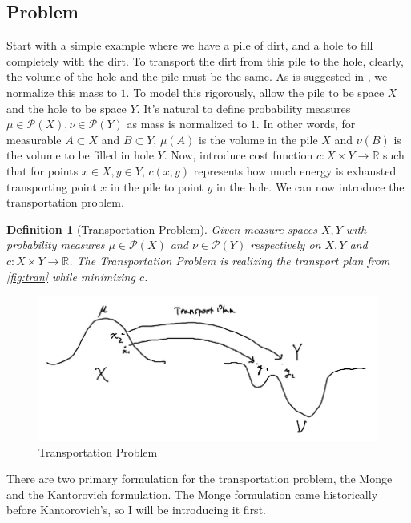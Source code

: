 \documentclass[12pt]{article}
\newcommand{\comp}[2]{
\vspace{0.2in}\begin{mdframed}[
  backgroundcolor=problem,
  userdefinedwidth=10cm,
  align=center,
  skipabove=\topsep,
  skipbelow=\topsep
  ]
  \emph{{#1}:\newline} {#2}
\end{mdframed}}
\theoremstyle{plain}
\newtheorem{defn}{Definition}[section]
\numberwithin{equation}{section}
\begin{document}
\subsection{Problem}
Start with a simple example where we have a pile of dirt, and a hole to fill completely with the dirt.
To transport the dirt from this pile to the hole, clearly, the volume of the hole and the pile must be the same. As is suggested in \cite{villani}, we normalize this mass to $1$.\newline
To model this rigorously, allow the pile to be space $X$ and the hole to be space $Y$. It's natural to define probability measures $\mu\in\mathcal{P}(X),\nu\in\mathcal{P}(Y)$ as mass is normalized to $1$.
In other words, for measurable $A\subset X$ and $B\subset Y$, $\mu(A)$ is the volume in the pile $X$ and $\nu(B)$ is the volume to be filled in hole $Y$.\newline
Now, introduce cost function $c: X\times Y \to \mathbb{R}$ such that for points $x\in X,y\in Y$, $c(x,y)$ represents how much energy is exhausted transporting point $x$ in the pile to point $y$ in the hole.\newline
We can now introduce the transportation problem.
\begin{defn}[Transportation Problem]\label{defn:tp}
Given measure spaces $X,Y$ with probability measures $\mu\in \mathcal{P}(X)$ and $\nu\in\mathcal{P}(Y)$ respectively on $X,Y$ and $c: X\times Y\to \mathbb{R}$. The Transportation Problem is realizing the transport plan from \autoref{fig:tran} while minimizing $c$.
\end{defn}
\begin{figure}[H]
  \center
  \includegraphics[scale=0.3]{transport.jpg}
  \caption{Transportation Problem}
  \label{fig:tran}
\end{figure}
There are two primary formulation for the transportation problem, the Monge and the Kantorovich formulation. The Monge formulation came historically before Kantorovich's, so I will be introducing it first.
\end{document}
